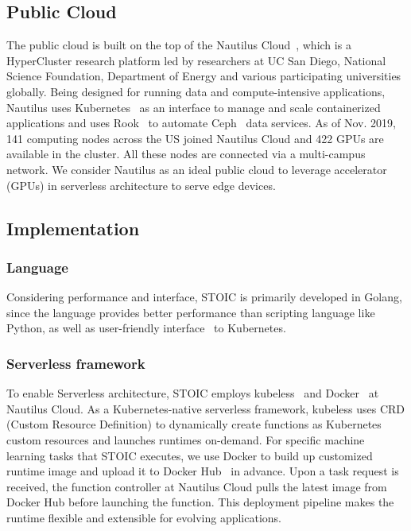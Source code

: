  \subsection{Public Cloud}
 
 The public cloud is built on the top of the Nautilus Cloud~\cite{ref:nautilus}, which is a HyperCluster research platform led by researchers at UC San Diego, National Science Foundation, Department of Energy and various participating universities globally. Being designed for running data and compute-intensive applications, Nautilus uses Kubernetes~\cite{ref:k8s} as an interface to manage and scale containerized applications and uses Rook~\cite{ref:rook} to automate Ceph~\cite{ref:ceph} data services. As of Nov. 2019, 141 computing nodes across the US joined Nautilus Cloud and 422 GPUs are available in the cluster. All these nodes are connected via a multi-campus network. We consider Nautilus as an ideal public cloud to leverage accelerator (GPUs) in serverless architecture to serve edge devices. 
 
 \subsection{Implementation}
 
 \subsubsection{Language}
 Considering performance and interface, STOIC is primarily developed in Golang, since the language provides better performance than scripting language like Python, as well as user-friendly interface~\cite{ref:client-go} to Kubernetes. 
 
 \BlankLine
 \subsubsection{Serverless framework}
 To enable Serverless architecture, STOIC employs kubeless~\cite{ref:kubeless} and Docker~\cite{ref:docker} at Nautilus Cloud. As a Kubernetes-native serverless framework, kubeless uses CRD (Custom Resource Definition)\cite{ref:crd} to dynamically create functions as Kubernetes custom resources and launches runtimes on-demand. For specific machine learning tasks that STOIC executes, we use Docker to build up customized runtime image and upload it to Docker Hub~\cite{ref:dockerhub} in advance. Upon a task request is received, the function controller at Nautilus Cloud pulls the latest image from Docker Hub before launching the function. This deployment pipeline makes the runtime flexible and extensible for evolving applications. 
 
